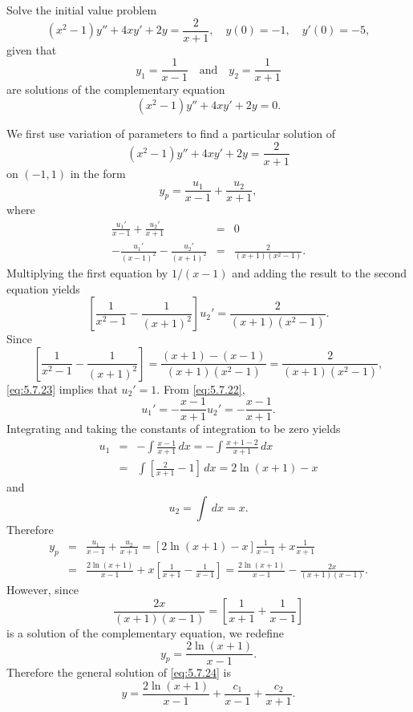 \documentclass{ximera}
\begin{document}
\begin{example}\label{example:5.7.4}
Solve the initial value problem
\begin{equation} \label{eq:5.7.21}
(x^2-1)y''+4xy'+2y=\frac{2}{x+1}, \quad  y(0)=-1,\quad y'(0)=-5,
\end{equation}
 given that
$$
y_1=\frac{1}{x-1}\quad\mbox{and}\quad y_2=\frac{1}{x+1}
$$
are  solutions of the complementary
equation
$$
(x^2-1)y''+4xy'+2y=0.
$$


\begin{explanation}
We first use variation of parameters to find a particular solution
of
$$
(x^2-1)y''+4xy'+2y=\frac{2}{x+1}
$$
on $(-1,1)$ in the form
$$
y_p=\frac{u_1}{x-1}+\frac{u_2}{x+1},
$$
where
\begin{eqnarray}
\frac{u_1'}{x-1}+\frac{u_2'}{x+1}&=&0\label{eq:5.7.22}\\
-\frac{u_1'}{(x-1)^2}-\frac{u_2'}{(x+1)^2}&=&\frac{2}{(x+1)(x^2-1)}.\nonumber
\end{eqnarray}
Multiplying the first equation by $1/(x-1)$ and adding the result to
the second equation yields
\begin{equation} \label{eq:5.7.23}
\left[\frac{1}{x^2-1}-\frac{1}{(x+1)^2}\right]u_2'=\frac{2}{(x+1)(x^2-1)}.
\end{equation}
Since
$$
\left[\frac{1}{x^2-1}-\frac{1}{(x+1)^2}\right]=\frac{(x+1)-(x-1)}{(x+1)(x^2-1)}
=\frac{2}{(x+1)(x^2-1)},
$$
\eqref{eq:5.7.23} implies that $u_2'=1$. From \eqref{eq:5.7.22},
$$
u_1'=-\frac{x-1}{x+1}u_2'=-\frac{x-1}{x+1}.
$$
Integrating and taking the constants of integration to be zero yields
\begin{eqnarray*}
u_1&=&-\int\frac{x-1}{x+1}\,dx=-\int\frac{x+1-2}{x+1}\,dx \\
&=&\int\left[\frac{2}{x+1}-1\right]\,dx=2\ln(x+1)-x
\end{eqnarray*}
and
$$
u_2=\int\,dx=x.
$$
Therefore
\begin{eqnarray*}
y_p&=&\frac{u_1}{x-1}+\frac{u_2}{x+1}=\left[2\ln(x+1)-x\right]\frac{1}{x-1}
+x\frac{1}{x+1} \\
&=&\frac{2\ln(x+1)}{x-1}+x\left[\frac{1}{x+1}-\frac{1}{x-1}\right]
=\frac{2\ln(x+1)}{x-1}-\frac{2x}{(x+1)(x-1)}.
\end{eqnarray*}
However, since
$$
\frac{2x}{(x+1)(x-1)}=\left[\frac{1}{x+1}+\frac{1}{x-1}\right]
$$
is a solution of the complementary equation, we redefine
$$
y_p=\frac{2\ln(x+1)}{x-1}.
$$
Therefore  the general solution of  \eqref{eq:5.7.24} is
\begin{equation} \label{eq:5.7.24}
y=\frac{2\ln(x+1)}{x-1}+\frac{c_1}{x-1}+\frac{c_2}{x+1}.

\end{equation}
\end{explanation}
\end{example}
\end{document}
